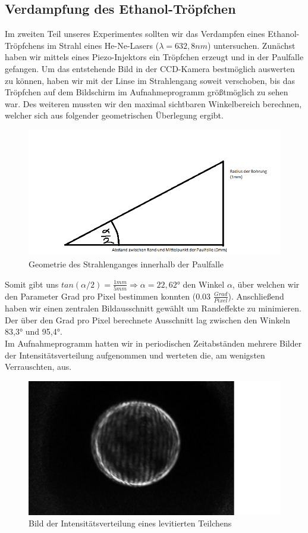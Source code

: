 \documentclass[10pt,a4paper]{article}
\begin{document}
\subsection{Verdampfung des Ethanol-Tröpfchen}
Im zweiten Teil unseres Experimentes sollten wir das Verdampfen eines Ethanol-Tröpfchens im Strahl eines He-Ne-Lasers ($\lambda = 632,8 nm$) untersuchen. Zunächst haben wir mittels eines Piezo-Injektors ein Tröpfchen erzeugt und in der Paulfalle gefangen. Um das entstehende Bild in der CCD-Kamera bestmöglich auswerten zu können, haben wir mit der Linse im Strahlengang soweit verschoben, bis das Tröpfchen auf dem Bildschirm im Aufnahmeprogramm größtmöglich zu sehen war. Des weiteren mussten wir den maximal sichtbaren Winkelbereich berechnen, welcher sich aus folgender geometrischen Überlegung ergibt. 
\begin{figure}[h]
	\includegraphics[scale = 0.5]{tan.png}
	\centering
	\caption{Geometrie des Strahlenganges innerhalb der Paulfalle}
	\label{optical_cavities}
\end{figure}
Somit gibt uns $tan(\alpha/2) = \frac{1mm}{5mm} \Rightarrow \alpha = 22,62°$ den Winkel $\alpha$, über welchen wir den Parameter Grad pro Pixel bestimmen konnten (0.03 $\frac{Grad}{Pixel}$). Anschließend haben wir einen zentralen Bildausschnitt gewählt um Randeffekte zu minimieren. Der über den Grad pro Pixel berechnete Ausschnitt lag zwischen den Winkeln 83,3° und 95,4°.  \\Im Aufnahmeprogramm hatten wir in periodischen Zeitabständen mehrere Bilder der Intensitätsverteilung aufgenommen und werteten die, am wenigsten Verrauschten, aus. \begin{figure}[h]
	\includegraphics[scale = 0.5]{Abbild.png}
	\centering
	\caption{Bild der Intensitätsverteilung eines levitierten Teilchens}
	\label{optical_cavities}
\end{figure}
\end{document}
